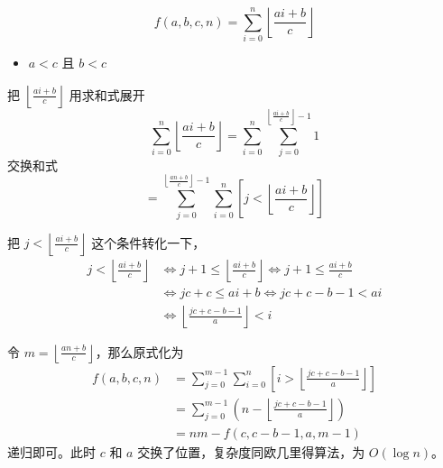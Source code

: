 \documentclass[UTF8]{beamer}
\begin{document}
    \begin{frame}
        $$
        f(a,b,c,n)=\sum_{i=0}^n\left\lfloor \frac{ai+b}{c} \right\rfloor
        $$
        \begin{itemize}
            \item $a<c$ 且 $b< c$
        \end{itemize}
        把 $\left\lfloor \frac{ai+b}{c} \right\rfloor$ 用求和式展开
        $$
        \sum_{i=0}^n\left\lfloor \frac{ai+b}{c} \right\rfloor
        =\sum_{i=0}^n\sum_{j=0}^{\left\lfloor \frac{ai+b}{c} \right\rfloor-1}1
        $$
        \pause
        交换和式
        $$
        =\sum_{j=0}^{\left\lfloor \frac{an+b}{c} \right\rfloor-1}\sum_{i=0}^n\left[j<\left\lfloor \frac{ai+b}{c} \right\rfloor\right]
        $$
    \end{frame}
    \begin{frame}
        把 $j<\left\lfloor \frac{ai+b}{c} \right\rfloor$ 这个条件转化一下，
$$
\begin{aligned}
j<\left\lfloor \frac{ai+b}{c} \right\rfloor
&\iff j+1\leq \left\lfloor \frac{ai+b}{c} \right\rfloor
\iff j+1\leq \frac{ai+b}{c}\\
&\iff jc+c\le ai+b \iff jc+c-b-1< ai\\
&\iff \left\lfloor\frac{jc+c-b-1}{a}\right\rfloor< i
\end{aligned}
$$

\vspace{-0.5em}
令 $m=\left\lfloor \frac{an+b}{c} \right\rfloor$，那么原式化为
\vspace{-1em}
$$
\begin{aligned}
f(a,b,c,n)&=\sum_{j=0}^{m-1}
\sum_{i=0}^n\left[i>\left\lfloor\frac{jc+c-b-1}{a}\right\rfloor \right]\\
&=\sum_{j=0}^{m-1}
(n-\left\lfloor\frac{jc+c-b-1}{a}\right\rfloor)\\
&=nm-f\left(c,c-b-1,a,m-1\right)
\end{aligned}
$$
递归即可。此时 $c$ 和 $a$ 交换了位置，复杂度同欧几里得算法，为 $O(\log n)$。
    \end{frame}
\end{document}
